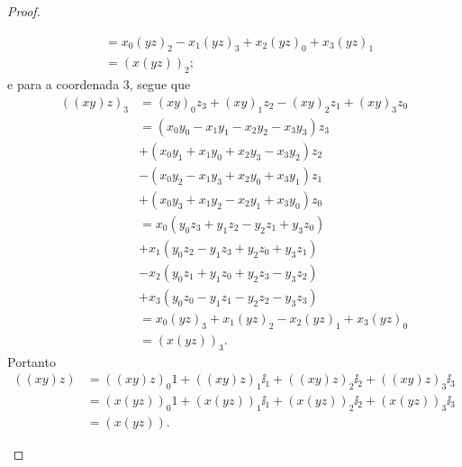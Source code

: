 \begin{proof}
\begin{itemize}
\begin{align*}
			&= x_0(yz)_2 - x_1(yz)_3 + x_2(yz)_0 + x_3(yz)_1 \\
			&= (x(yz))_2;
		\end{align*}
	e para a coordenada $3$, segue que
		\begin{align*}
		((xy)z)_3 &= (xy)_0z_3 + (xy)_1z_2 - (xy)_2z_1 + (xy)_3z_0 \\
			&= (x_0y_0 - x_1y_1 - x_2y_2 - x_3y_3)z_3 \\
			&+ (x_0y_1 + x_1y_0 + x_2y_3 - x_3y_2)z_2 \\
			&- (x_0y_2 - x_1y_3 + x_2y_0 + x_3y_1)z_1 \\
			&+ (x_0y_3 + x_1y_2 - x_2y_1 + x_3y_0)z_0 \\
			&= x_0(y_0z_3 + y_1z_2 - y_2z_1 + y_3z_0) \\
			&+ x_1(y_0z_2 - y_1z_3 + y_2z_0 + y_3z_1) \\
			&- x_2(y_0z_1 + y_1z_0 + y_2z_3 - y_3z_2) \\
			&+ x_3(y_0z_0 - y_1z_1 - y_2z_2 - y_3z_3) \\
			&= x_0(yz)_3 + x_1(yz)_2 - x_2(yz)_1 + x_3(yz)_0 \\
			&= (x(yz))_3.
		\end{align*}
	Portanto
		\begin{align*}
		((xy)z) &= ((xy)z)_0 1 + ((xy)z)_1 \ii_1 + ((xy)z)_2 \ii_2 + ((xy)z)_3 \ii_3 \\
			&= (x(yz))_0 1 + (x(yz))_1 \ii_1 + (x(yz))_2 \ii_2 + (x(yz))_3 \ii_3 \\
			&= (x(yz)).
		\end{align*}
	

\end{itemize}
\end{proof}

